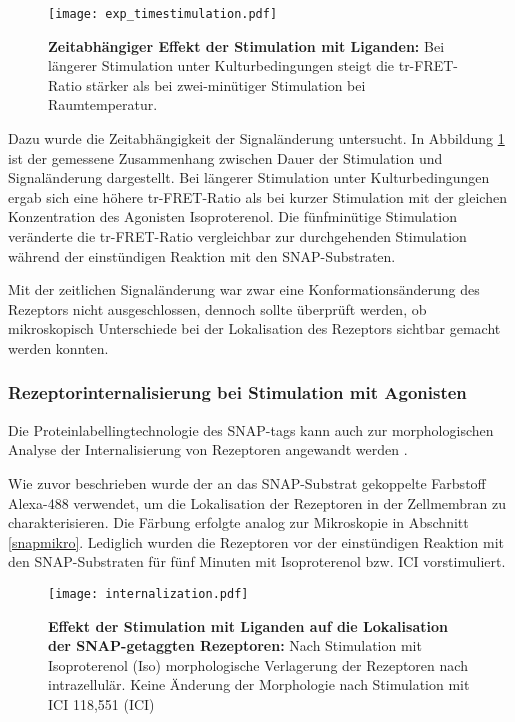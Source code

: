 \begin{figure}[htbp]
	\centering
    \texttt{[image: exp\_timestimulation.pdf]}
    \caption{\textbf{Zeitabhängiger Effekt der Stimulation mit Liganden:} Bei längerer Stimulation unter Kulturbedingungen steigt die tr-FRET-Ratio stärker als bei zwei-minütiger Stimulation bei Raumtemperatur.} 
    \label{fig:timestimulation}
\end{figure}

Dazu wurde die Zeitabhängigkeit der Signaländerung untersucht. In Abbildung \ref{fig:timestimulation} ist der gemessene Zusammenhang zwischen Dauer der Stimulation und Signaländerung dargestellt. Bei längerer Stimulation unter Kulturbedingungen ergab sich eine höhere tr-FRET-Ratio als bei kurzer Stimulation mit der gleichen Konzentration des Agonisten Isoproterenol. Die fünfminütige Stimulation veränderte die tr-FRET-Ratio vergleichbar zur durchgehenden Stimulation während der einstündigen Reaktion mit den SNAP-Substraten.
 
Mit der zeitlichen Signaländerung war zwar eine Konformationsänderung des Rezeptors nicht ausgeschlossen, dennoch sollte überprüft werden, ob mikroskopisch Unterschiede bei der Lokalisation des Rezeptors sichtbar gemacht werden konnten.

\subsubsection{Rezeptorinternalisierung bei Stimulation mit Agonisten}
Die Proteinlabellingtechnologie des SNAP-tags kann auch zur morphologischen Analyse der Internalisierung von Rezeptoren angewandt werden \parencite{Koo2012}. 

Wie zuvor beschrieben wurde der an das SNAP-Substrat gekoppelte Farbstoff Alexa-488 verwendet, um die Lokalisation der Rezeptoren in der Zellmembran zu charakterisieren. Die Färbung erfolgte analog zur Mikroskopie in Abschnitt \ref{snapmikro}. Lediglich wurden die Rezeptoren vor der einstündigen Reaktion mit den SNAP-Substraten für fünf Minuten mit Isoproterenol bzw. ICI vorstimuliert.

\begin{figure}[htbp]
	\centering
    \texttt{[image: internalization.pdf]}
    \caption{\textbf{Effekt der Stimulation mit Liganden auf die Lokalisation der SNAP-getaggten Rezeptoren:} Nach Stimulation mit Isoproterenol (Iso) morphologische Verlagerung der Rezeptoren nach intrazellulär. Keine Änderung der Morphologie nach Stimulation mit ICI 118,551 (ICI)} 
    \label{fig:internalization}
\end{figure}

